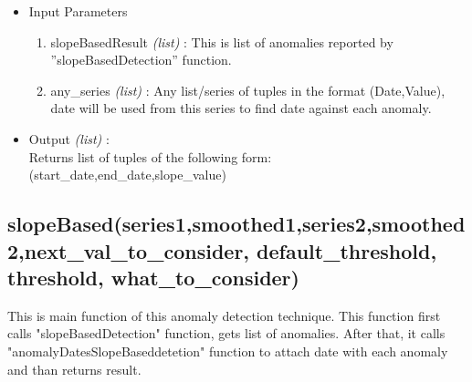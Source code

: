 \begin{itemize}
 \item Input Parameters
 
 \begin{enumerate}
  \item slopeBasedResult \textit{(list)} : This is list of anomalies reported by ”slopeBasedDetection” function.
  \item any\_series \textit{(list)} : Any list/series of tuples in the format (Date,Value), date will be used from this series to find date against each anomaly.
 \end{enumerate}

 \item Output \textit{(list)} : \\
 	Returns list of tuples of the following form: \\ 
 	(start\_date,end\_date,slope\_value)

\end{itemize}


\subsection{slopeBased(series1,smoothed1,series2,smoothed2,next\_val\_to\_consider, default\_threshold, threshold, what\_to\_consider)}

This is main function of this anomaly detection technique. This function first calls "slopeBasedDetection" function, gets list of anomalies. 
After that, it calls "anomalyDatesSlopeBaseddetetion" function to attach date with each anomaly and than returns result.

